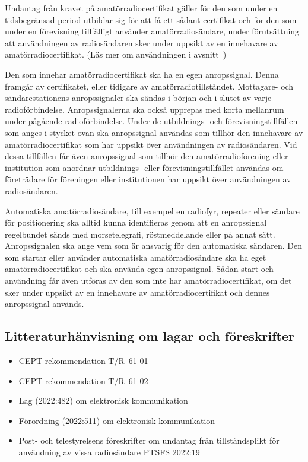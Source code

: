 Undantag från kravet på amatörradiocertifikat gäller för den som under en
tidsbegränsad period utbildar sig för att få ett sådant certifikat och för den
som under en förevisning tillfälligt använder amatörradiosändare, under
förutsättning att användningen av radiosändaren sker under uppsikt av en
innehavare av amatörradiocertifikat.
(Läs mer om användningen i avsnitt~)

Den som innehar amatörradiocertifikat ska ha en egen anropssignal.
Denna framgår av certifikatet, eller tidigare av amatörradiotillståndet.
Mottagare- och sändarestationens anropssignaler ska sändas i början och i
slutet av varje radioförbindelse.
Anropssignalerna ska också upprepas med korta mellanrum under pågående
radioförbindelse. Under de utbildnings- och förevisningstillfällen som anges i
stycket ovan ska anropssignal användas som tillhör den innehavare av
amatörradiocertifikat som har uppsikt över användningen av radiosändaren.
Vid dessa tillfällen får även anropssignal som tillhör den amatörradioförening
eller institution som anordnar utbildnings- eller förevisningstillfället
användas om företrädare för föreningen eller institutionen har uppsikt över
användningen av radiosändaren.

\newpage
Automatiska amatörradiosändare, till exempel en radiofyr, repeater eller
sändare för positionering ska alltid kunna identifieras genom att en
anropssignal regelbundet sänds med morsetelegrafi, röstmeddelande eller
på annat sätt.
Anropssignalen ska ange vem som är ansvarig för den automatiska sändaren.
Den som startar eller använder automatiska amatörradiosändare ska ha eget
amatörradiocertifikat och ska använda egen anropssignal.
Sådan start och användning får även utföras av den som inte har
amatörradiocertifikat, om det sker under uppsikt av en innehavare av
amatörradiocertifikat och dennes anropssignal används.

\subsection{Litteraturhänvisning om lagar och föreskrifter}

\begin{itemize}
\item CEPT rekommendation T/R~61-01~\cite{TR6101}
\item CEPT rekommendation T/R~61-02~\cite{TR6102}
\item Lag (2022:482) om elektronisk kommunikation~\cite{SFS2022:482}
\item Förordning (2022:511) om elektronisk kommunikation~\cite{SFS2022:511}
\item Post- och telestyrelsens föreskrifter om undantag från tillståndsplikt för
användning av vissa radiosändare PTSFS 2022:19~\cite{PTSFS2022:19}
\end{itemize}
